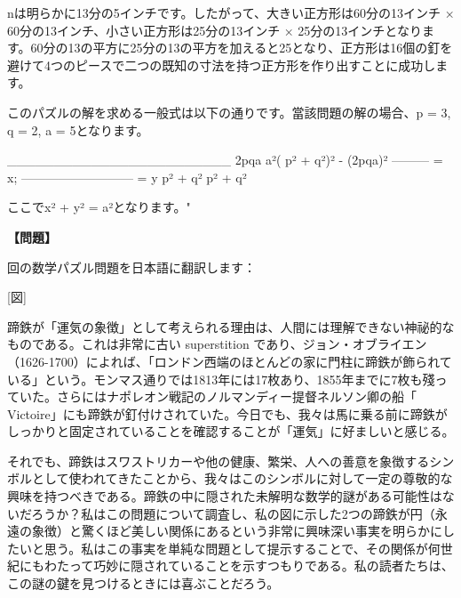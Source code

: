 \documentclass[10pt,a4paper,oneside,openany]{ltjsbook}
\begin{document}
\begin{tcolorbox}[colback=softblue,colframe=primaryblue,title=\textbf{第 159 問：THE SQUARE OF VENEER.},arc=2mm,boxrule=1pt,breakable]
{nは明らかに13分の5インチです。したがって、大きい正方形は60分の13インチ × 60分の13インチ、小さい正方形は25分の13インチ × 25分の13インチとなります。60分の13の平方に25分の13の平方を加えると25となり、正方形は16個の釘を避けて4つのピースで二つの既知の寸法を持つ正方形を作り出すことに成功します。

このパズルの解を求める一般式は以下の通りです。當該問題の解の場合、p = 3, q = 2, a = 5となります。

                         \_\_\_\_\_\_\_\_\_\_\_\_\_\_\_\_\_\_\_\_\_\_\_\_
       2pqa           \/ a²( p² + q²)² - (2pqa)²
     --------- = x;   --------------------------- = y
      p² + q²                  p² + q²

    ここでx² + y² = a²となります。"
}
\end{tcolorbox}

\begin{tcolorbox}[colback=softblue,colframe=primaryblue,title=\textbf{第 160 問：THE TWO HORSESHOES.},arc=2mm,boxrule=1pt,breakable]
\textbf{【問題】}\par\vspace{0.3em}
回の数学パズル問題を日本語に翻訳します：

[図]

蹄鉄が「運気の象徴」として考えられる理由は、人間には理解できない神祕的なものである。これは非常に古い superstition であり、ジョン・オブライエン（1626-1700）によれば、「ロンドン西端のほとんどの家に門柱に蹄鉄が飾られている」という。モンマス通りでは1813年には17枚あり、1855年までに7枚も殘っていた。さらにはナポレオン戦記のノルマンディー提督ネルソン卿の船「 Victoire」にも蹄鉄が釘付けされていた。今日でも、我々は馬に乗る前に蹄鉄がしっかりと固定されていることを確認することが「運気」に好ましいと感じる。

それでも、蹄鉄はスワストリカーや他の健康、繁栄、人への善意を象徴するシンボルとして使われてきたことから、我々はこのシンボルに対して一定の尊敬的な興味を持つべきである。蹄鉄の中に隠された未解明な数学的謎がある可能性はないだろうか？私はこの問題について調査し、私の図に示した2つの蹄鉄が円（永遠の象徴）と驚くほど美しい関係にあるという非常に興味深い事実を明らかにしたいと思う。私はこの事実を単純な問題として提示することで、その関係が何世紀にもわたって巧妙に隠されていることを示すつもりである。私の読者たちは、この謎の鍵を見つけるときには喜ぶことだろう。


\end{tcolorbox}
\end{document}
